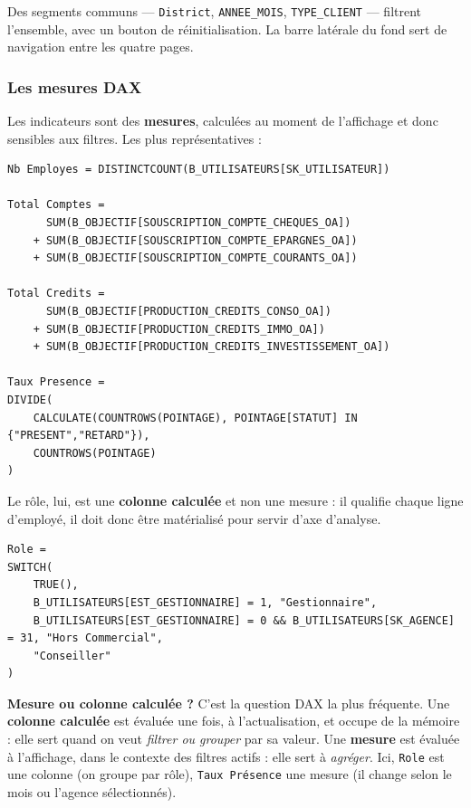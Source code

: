 \vspace{0.5em}
Des segments communs --- \texttt{District}, \texttt{ANNEE\_MOIS},
\texttt{TYPE\_CLIENT} --- filtrent l'ensemble, avec un bouton de
réinitialisation. La barre latérale du fond sert de navigation entre les
quatre pages.

\subsubsection{Les mesures DAX}

Les indicateurs sont des \textbf{mesures}, calculées au moment de l'affichage
et donc sensibles aux filtres. Les plus représentatives :

\begin{lstlisting}[style=shell]
Nb Employes = DISTINCTCOUNT(B_UTILISATEURS[SK_UTILISATEUR])

Total Comptes =
      SUM(B_OBJECTIF[SOUSCRIPTION_COMPTE_CHEQUES_OA])
    + SUM(B_OBJECTIF[SOUSCRIPTION_COMPTE_EPARGNES_OA])
    + SUM(B_OBJECTIF[SOUSCRIPTION_COMPTE_COURANTS_OA])

Total Credits =
      SUM(B_OBJECTIF[PRODUCTION_CREDITS_CONSO_OA])
    + SUM(B_OBJECTIF[PRODUCTION_CREDITS_IMMO_OA])
    + SUM(B_OBJECTIF[PRODUCTION_CREDITS_INVESTISSEMENT_OA])

Taux Presence =
DIVIDE(
    CALCULATE(COUNTROWS(POINTAGE), POINTAGE[STATUT] IN {"PRESENT","RETARD"}),
    COUNTROWS(POINTAGE)
)
\end{lstlisting}

Le rôle, lui, est une \textbf{colonne calculée} et non une mesure : il
qualifie chaque ligne d'employé, il doit donc être matérialisé pour servir
d'axe d'analyse.

\begin{lstlisting}[style=shell]
Role =
SWITCH(
    TRUE(),
    B_UTILISATEURS[EST_GESTIONNAIRE] = 1, "Gestionnaire",
    B_UTILISATEURS[EST_GESTIONNAIRE] = 0 && B_UTILISATEURS[SK_AGENCE] = 31, "Hors Commercial",
    "Conseiller"
)
\end{lstlisting}

\begin{retenir}
\textbf{Mesure ou colonne calculée ?} C'est la question DAX la plus fréquente.
Une \textbf{colonne calculée} est évaluée une fois, à l'actualisation, et
occupe de la mémoire : elle sert quand on veut \emph{filtrer ou grouper} par
sa valeur. Une \textbf{mesure} est évaluée à l'affichage, dans le contexte des
filtres actifs : elle sert à \emph{agréger}. Ici, \texttt{Role} est une
colonne (on groupe par rôle), \texttt{Taux Présence} une mesure (il change
selon le mois ou l'agence sélectionnés).
\end{retenir}

